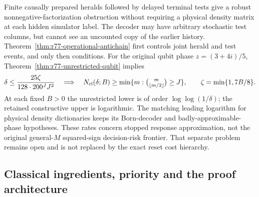 Finite causally prepared heralds followed by delayed terminal tests
give a robust nonnegative-factorization obstruction without requiring
a physical density matrix at each hidden simulator label.  The
decoder may have arbitrary stochastic test columns, but cannot see an
uncounted copy of the earlier history.  Theorem~\ref{thm:r77-operational-antichain}
first controls joint herald and test events, and only then conditions.
For the original qubit phase $z=(3+4i)/5$,
Theorem~\ref{thm:r77-unrestricted-qubit} implies
\begin{equation}\label{eq:r77-intro-arithmetic}
 \delta\le\frac{25\zeta}{128\cdot200^J J^2}
 \quad\Longrightarrow\quad N_{\rm cl}(\delta;B)\ge
 \min\{m:\tbinom m{\lfloor m/2\rfloor}\ge J\},
 \qquad\zeta=\min\{1,7B/8\}.
\end{equation}
At each fixed $B>0$ the unrestricted lower is of order
$\log\log(1/\delta)$; the retained constructive upper is logarithmic.
The matching leading logarithm for physical density dictionaries keeps
its Born-decoder and badly-approximable-phase hypotheses.  These rates
concern stopped response approximation, not the original general-$M$
squared-sign decision-risk frontier.  That separate problem remains
open and is not replaced by the exact reset cost hierarchy.

\subsection*{Classical ingredients, priority and the proof architecture}


